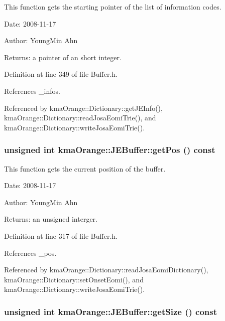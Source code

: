 This function gets the starting pointer of the list of information codes. 

\begin{Desc}
\item[Date:]2008-11-17 \end{Desc}
\begin{Desc}
\item[Author:]YoungMin Ahn \end{Desc}
\begin{Desc}
\item[Returns:]a pointer of an short integer. \end{Desc}


Definition at line 349 of file Buffer.h.

References \_\-infos.

Referenced by kmaOrange::Dictionary::getJEInfo(), kmaOrange::Dictionary::readJosaEomiTrie(), and kmaOrange::Dictionary::writeJosaEomiTrie().\hypertarget{classkmaOrange_1_1JEBuffer_9b038ab505a0d970bc8a8dddef62f02c}{
\subsubsection[{getPos}]{\setlength{\rightskip}{0pt plus 5cm}unsigned int kmaOrange::JEBuffer::getPos () const}}
\label{classkmaOrange_1_1JEBuffer_9b038ab505a0d970bc8a8dddef62f02c}


This function gets the current position of the buffer. 

\begin{Desc}
\item[Date:]2008-11-17 \end{Desc}
\begin{Desc}
\item[Author:]YoungMin Ahn \end{Desc}
\begin{Desc}
\item[Returns:]an unsigned interger. \end{Desc}


Definition at line 317 of file Buffer.h.

References \_\-pos.

Referenced by kmaOrange::Dictionary::readJosaEomiDictionary(), kmaOrange::Dictionary::setOnsetEomi(), and kmaOrange::Dictionary::writeJosaEomiTrie().\hypertarget{classkmaOrange_1_1JEBuffer_2865cf31a9ee16e962c7c0c9aa564b32}{
\subsubsection[{getSize}]{\setlength{\rightskip}{0pt plus 5cm}unsigned int kmaOrange::JEBuffer::getSize () const}}
\label{classkmaOrange_1_1JEBuffer_2865cf31a9ee16e962c7c0c9aa564b32}


